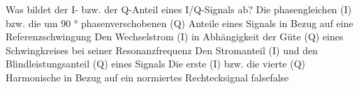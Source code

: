     {Was bildet der I- bzw. der Q-Anteil eines I/Q-Signals ab?}
    {Die phasengleichen (I) bzw. die um 90 ° phasenverschobenen (Q) Anteile eines Signals in Bezug auf eine Referenzschwingung}
    {Den Wechselstrom (I) in Abhängigkeit der Güte (Q) eines Schwingkreises bei seiner Resonanzfrequenz}
    {Den Stromanteil (I) und den Blindleistungsanteil (Q) eines Signals}
    {Die erste (I) bzw. die vierte (Q) Harmonische in Bezug auf ein normiertes Rechtecksignal}
    {false}{false}
